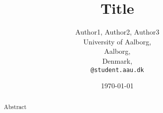 \documentclass[a4paper,12pt, twocolumn]{article}
\begin{document}
\title{Title}
\author{Author1, Author2, Author3\\
  University of Aalborg,\\
  Aalborg,\\
  Denmark,\\
  \texttt{@student.aau.dk}}
\date{\today}
\maketitle

\begin{abstract}
Abstract
\end{abstract}








\end{document}
